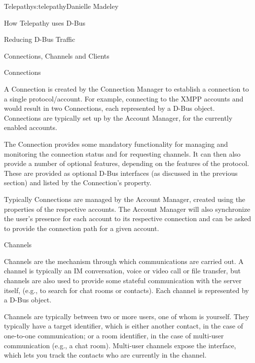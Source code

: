 \begin{aosachapter}{Telepathy}{s:telepathy}{Danielle Madeley}
\begin{aosasect1}{How Telepathy uses D-Bus}
\begin{aosasect2}{Reducing D-Bus Traffic}
\end{aosasect2}

\end{aosasect1}

\begin{aosasect1}{Connections, Channels and Clients}
\label{sec.telepathy.ccc}

\begin{aosasect2}{Connections}

A Connection is created by the Connection Manager to establish a
connection to a single protocol/account. For example, connecting to
the XMPP accounts  and 
would result in two Connections, each represented by a D-Bus
object. Connections are typically set up by the Account Manager, for
the currently enabled accounts.

The Connection provides some mandatory functionality for managing and
monitoring the connection status and for requesting channels. It can
then also provide a number of optional features, depending on the
features of the protocol. These are provided as optional D-Bus
interfaces (as discussed in the previous section) and listed by the
Connection's  property.

Typically Connections are managed by the Account Manager, created
using the properties of the respective accounts. The Account Manager
will also synchronize the user's presence for each account to its
respective connection and can be asked to provide the connection path
for a given account.

\end{aosasect2}

\begin{aosasect2}{Channels}

Channels are the mechanism through which communications are carried
out.  A channel is typically an IM conversation, voice or video call
or file transfer, but channels are also used to provide some stateful
communication with the server itself, (e.g., to search for chat rooms
or contacts). Each channel is represented by a D-Bus object.

Channels are typically between two or more users, one of whom is
yourself. They typically have a target identifier, which is either
another contact, in the case of one-to-one communication; or a room
identifier, in the case of multi-user communication (e.g., a chat
room). Multi-user channels expose the  interface, which
lets you track the contacts who are currently in the channel.


\end{aosasect2}
\end{aosasect1}
\end{aosachapter}
